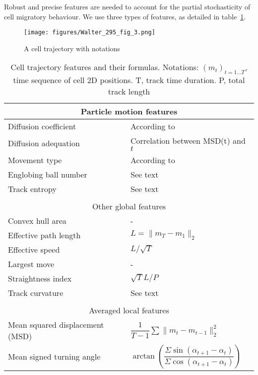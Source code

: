 Robust and precise features are needed to account for the partial
stochasticity of cell migratory behaviour. We use three types of
features, as detailed in table~\ref{features}. 
\begin{figure}[!tpb]%
\centerline{\texttt{[image: figures/Walter\_295\_fig\_3.png]}}
\caption{A cell trajectory with notations}
\label{fig:01}
\end{figure}
\begin{table}[!h]
\centering
\caption{Cell trajectory features and their formulas. Notations: $(m_t)_{t=1\ldots T}$, time sequence of cell 2D positions. T, track time duration. P, total track length \label{features}}
{\begin{tabular}{ll}\hline
\multicolumn{2}{c}{Particle motion features}\\
\hline
Diffusion coefficient & According to~\cite{pmid16043363} \\
Diffusion adequation & Correlation between MSD(t) and $t$ \\
Movement type & According to~\cite{pmid16043363} \\
Englobing ball number & See text\\
Track entropy & See text \\
\hline
&\\
\multicolumn{2}{c}{Other global features}\\
\hline
Convex hull area & - \\
Effective path length & $L=\|m_{T}-m_1\|_2$ \\
Effective speed &  $L/\sqrt{T} $ \\
Largest move & - \\
Straightness index & $\sqrt{T} L/P $ \\
Track curvature & See text \\
\hline
&\\
\multicolumn{2}{c}{Averaged local features}\\
\hline
\parbox{2.5cm}{\raggedright Mean squared displacement (MSD)} & $\dfrac{1}{T-1}\sum \|m_{t}-m_{t-1}\|_2^2 $\\
\parbox{2.5cm}{\raggedright Mean signed turning angle} & $\arctan(\dfrac{\Sigma \sin(\alpha_{t+1}-\alpha_{t}) }{\Sigma \cos(\alpha_{t+1}-\alpha_{t}) }) $\\
\hline
\end{tabular}}{}
\end{table}

